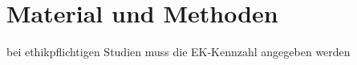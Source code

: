 \chapter{Material und Methoden}
\label{ch:methoden}

bei ethikpflichtigen Studien muss die EK-Kennzahl angegeben werden
